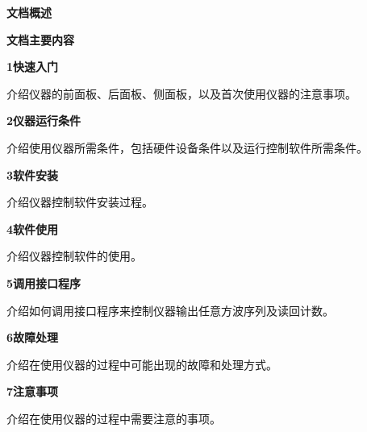 \newpage
\noindent\xiaoer\textbf{文档概述}
\vspace{1.3cm}

\noindent\sanhao\textbf{文档主要内容}
\vspace{0.7cm}

\noindent\xiaosi\textbf{1\quad 快速入门}
\vspace{0.4cm}

\song 介绍仪器的前面板、后面板、侧面板，以及首次使用仪器的注意事项。
\vspace{0.9cm}

\noindent\xiaosi\textbf{2\quad 仪器运行条件}
\vspace{0.4cm}

\song 介绍使用仪器所需条件，包括硬件设备条件以及运行控制软件所需条件。
\vspace{0.9cm}

\noindent\xiaosi\textbf{3\quad 软件安装}
\vspace{0.4cm}

\song 介绍仪器控制软件安装过程。
\vspace{0.9cm}

\noindent\xiaosi\textbf{4\quad 软件使用}
\vspace{0.4cm}

\song 介绍仪器控制软件的使用。
\vspace{0.9cm}

\noindent\xiaosi\textbf{5\quad 调用接口程序}
\vspace{0.4cm}

\song 介绍如何调用接口程序来控制仪器输出任意方波序列及读回计数。
\vspace{0.9cm}

\noindent\xiaosi\textbf{6\quad 故障处理}
\vspace{0.4cm}

\song 介绍在使用仪器的过程中可能出现的故障和处理方式。
\vspace{0.9cm}

\noindent\xiaosi\textbf{7\quad 注意事项}
\vspace{0.4cm}

\song 介绍在使用仪器的过程中需要注意的事项。
